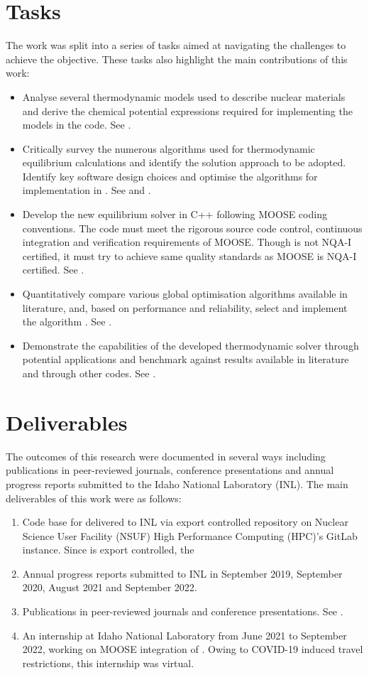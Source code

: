 \section{Tasks}
    The work was split into a series of tasks aimed at navigating the challenges to achieve the objective. These tasks also highlight the main contributions of this work:
    \begin{itemize}
        \item Analyse several thermodynamic models used to describe nuclear materials and derive the chemical potential expressions required for implementing the models in the code. See .
        \item Critically survey the numerous algorithms used for thermodynamic equilibrium calculations and identify the solution approach to be adopted. Identify key software design choices and optimise the algorithms for implementation in {\GEM}. See  and .
        \item Develop the new equilibrium solver in C++ following MOOSE coding conventions. The code must meet the rigorous source code control, continuous integration and verification requirements of MOOSE. Though {\GEM} is not NQA-I certified, it must try to achieve same quality standards as MOOSE is NQA-I certified. See .
        \item Quantitatively compare various global optimisation algorithms available in literature, and, based on performance and reliability, select and implement the algorithm {\GEM}. See .
        \item Demonstrate the capabilities of the developed thermodynamic solver through potential applications and benchmark against results available in literature and through other codes. See .
    \end{itemize}

\section{Deliverables}
	The outcomes of this research were documented in several ways including publications in peer-reviewed journals, conference presentations and annual progress reports submitted to the Idaho National Laboratory (INL). The main deliverables of this work were as follows:
	\begin{enumerate}
	\item Code base for {\GEM} delivered to INL via export controlled repository on Nuclear Science User Facility (NSUF) High Performance Computing (HPC)'s GitLab instance. Since {\YJ} is export controlled, the 
	\item Annual progress reports submitted to INL in September 2019, September 2020, August 2021 and September 2022. 
	\item Publications in peer-reviewed journals and conference presentations. See .
	\item An internship at Idaho National Laboratory from June 2021 to September 2022, working on MOOSE integration of \GEM. Owing to COVID-19 induced travel restrictions, this internship was virtual.
	\end{enumerate}
	